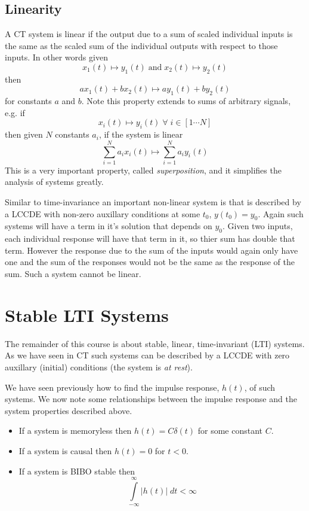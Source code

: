 \subsection{Linearity}

A CT system is linear if the output due to a sum of scaled individual inputs is the same as the scaled sum of the individual outputs with respect to those inputs. In other words given
\[
x_1(t) \mapsto y_1(t) \;\text{and}\; x_2(t) \mapsto y_2(t)
\]
then
\[
a x_1(t) + b x_2(t) \mapsto a y_1(t) + b y_2(t)
\]
for constants $a$ and $b$.
Note this property extends to sums of arbitrary signals, e.g. if
\[
x_i(t) \mapsto y_i(t) \; \forall\; i \in [1 \cdots N]
\]
then given $N$ constants $a_i$, if the system is linear
\[
\sum\limits_{i = 1}^N a_i x_i(t) \mapsto \sum\limits_{i = 1}^N a_i y_i(t) 
\]
This is a very important property, called {\it superposition}, and it simplifies the analysis of systems greatly.

Similar to time-invariance an important non-linear system is that is described by a LCCDE with non-zero auxillary conditions at some $t_0$, $y(t_0) = y_0$. Again such systems will have a term in it's solution that depends on $y_0$. Given two inputs, each individual response will have that term in it, so thier sum has double that term. However the response due to the sum of the inputs would again only have one and the sum of the responses would not be the same as the response of the sum. Such a system cannot be linear.

\section{Stable LTI Systems}

The remainder of this course is about stable, linear, time-invariant (LTI) systems. As we have seen in CT such systems can be described by a LCCDE with zero auxillary (initial) conditions (the system is \emph{at rest}). 

We have seen previously how to find the impulse response, $h(t)$, of such systems. We now note some relationships between the impulse response and the system properties described above.

\begin{itemize}
\item If a system is memoryless then $h(t) = C \delta(t)$ for some constant $C$.
\item If a system is causal then  $h(t) = 0$ for $t < 0$.
\item If a system is BIBO stable then
  \[
  \int\limits_{-\infty}^{\infty} |h(t)| \; dt < \infty
  \]
\end{itemize}

